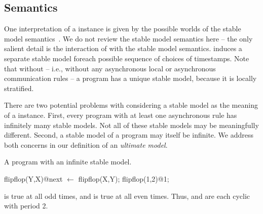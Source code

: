 


\subsection{Semantics}
One interpretation of a \lang instance is given by the possible worlds of the stable model semantics~\cite{stable-model}.  We do not review the stable model semantics here -- the only salient detail is the interaction of with the stable model semantics.   induces a separate stable model foreach possible sequence of choices of timestamps.  Note that without  -- i.e., without any asynchronous local or asynchronous communication rules -- a \lang program has a unique stable model, because it is locally stratified.

There are two potential problems with considering a stable model as the meaning of a \lang instance.  First, every program with at least one asynchronous rule has infinitely many stable models.  Not all of these stable models may be meaningfully different.  Second, a stable model of a \lang program may itself be infinite.  We address both concerns in our definition of an {\em ultimate model}.

\begin{example}
\label{ex:flipflop}
A \lang program with an infinite stable model.

\begin{Dedalus}
flipflop(Y,X)@next \(\leftarrow\) flipflop(X,Y);
flipflop(1,2)@1;
\end{Dedalus}

 is true at all odd times, and  is true at all even times.  Thus,  and  are each cyclic with period 2.
\end{example}

